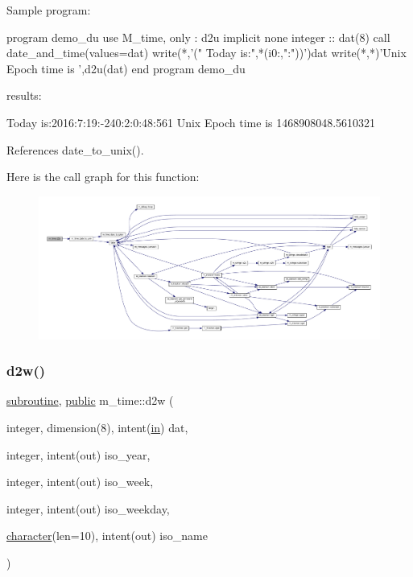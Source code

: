 \begin{DoxyVerb}Sample program:

 program demo_du
 use M_time, only : d2u
 implicit none
 integer           :: dat(8)
    call date_and_time(values=dat)
    write(*,'(" Today is:",*(i0:,":"))')dat
    write(*,*)'Unix Epoch time is ',d2u(dat)
 end program demo_du

results:

 Today is:2016:7:19:-240:2:0:48:561
 Unix Epoch time is    1468908048.5610321 \end{DoxyVerb}
 

References date\+\_\+to\+\_\+unix().

Here is the call graph for this function\+:
\nopagebreak
\begin{figure}[H]
\begin{center}
\leavevmode
\includegraphics[width=350pt]{namespacem__time_a1506e2889a156387df4481ed0534be81_cgraph}
\end{center}
\end{figure}
\mbox{\label{namespacem__time_ad4ff99ad6f6d5282c4b65ad636a2a627}} 
\subsubsection{\texorpdfstring{d2w()}{d2w()}}
{\footnotesize\ttfamily \hyperlink{M__stopwatch_83_8txt_acfbcff50169d691ff02d4a123ed70482}{subroutine}, \hyperlink{M__stopwatch_83_8txt_a2f74811300c361e53b430611a7d1769f}{public} m\+\_\+time\+::d2w (\begin{DoxyParamCaption}\item[{integer, dimension(8), intent(\hyperlink{M__journal_83_8txt_afce72651d1eed785a2132bee863b2f38}{in})}]{dat,  }\item[{integer, intent(out)}]{iso\+\_\+year,  }\item[{integer, intent(out)}]{iso\+\_\+week,  }\item[{integer, intent(out)}]{iso\+\_\+weekday,  }\item[{\hyperlink{option__stopwatch_83_8txt_abd4b21fbbd175834027b5224bfe97e66}{character}(len=10), intent(out)}]{iso\+\_\+name }\end{DoxyParamCaption})}



